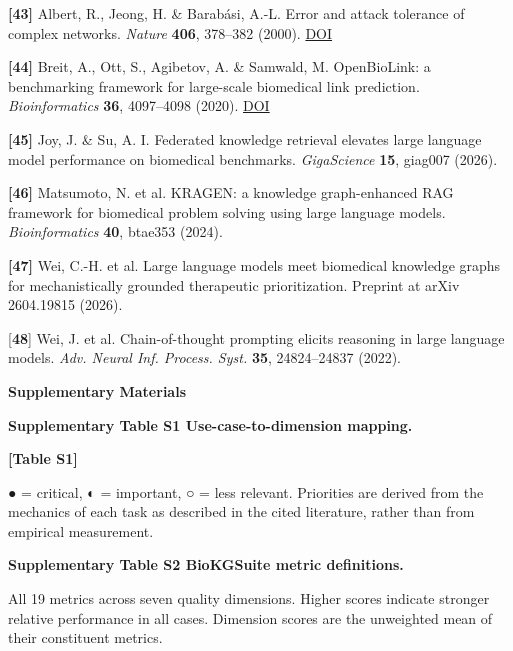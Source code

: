 \textbf{{[}43{]}} Albert, R., Jeong, H. \& Barabási, A.-L. Error and attack tolerance of complex networks. \emph{Nature} \textbf{406}, 378--382 (2000). \href{https://doi.org/10.1038/35019019}{DOI}

\textbf{{[}44{]}} Breit, A., Ott, S., Agibetov, A. \& Samwald, M. OpenBioLink: a benchmarking framework for large-scale biomedical link prediction. \emph{Bioinformatics} \textbf{36}, 4097--4098 (2020). \href{https://doi.org/10.1093/bioinformatics/btaa274}{DOI}

\textbf{{[}45{]}} Joy, J. \& Su, A. I. Federated knowledge retrieval elevates large language model performance on biomedical benchmarks. \emph{GigaScience} \textbf{15}, giag007 (2026).

\textbf{{[}46{]}} Matsumoto, N. et al. KRAGEN: a knowledge graph-enhanced RAG framework for biomedical problem solving using large language models. \emph{Bioinformatics} \textbf{40}, btae353 (2024).

\textbf{{[}47{]}} Wei, C.-H. et al. Large language models meet biomedical knowledge graphs for mechanistically grounded therapeutic prioritization. Preprint at arXiv 2604.19815 (2026).

{[}\textbf{48}{]} Wei, J. et al. Chain-of-thought prompting elicits reasoning in large language models. \emph{Adv. Neural Inf. Process. Syst.} \textbf{35}, 24824--24837 (2022).

\textbf{Supplementary Materials}

\textbf{Supplementary Table S1 \textbar{} Use-case-to-dimension mapping.}

\textbf{{[}Table S1{]}}

● = critical, ◐ = important, ○ = less relevant. Priorities are derived from the mechanics of each task as described in the cited literature, rather than from empirical measurement.

\textbf{Supplementary Table S2 \textbar{} BioKGSuite metric definitions.}

All 19 metrics across seven quality dimensions. Higher scores indicate stronger relative performance in all cases. Dimension scores are the unweighted mean of their constituent metrics.

